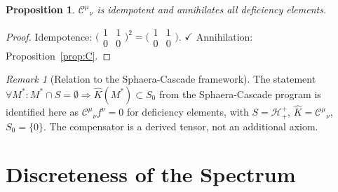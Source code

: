 \documentclass[12pt,a4paper]{article}
\newtheorem{proposition}[theorem]{Proposition}
\theoremstyle{remark}
\newtheorem*{remark}{Remark}
\begin{document}
\begin{proposition}\label{prop:calC}
$\mathcal{C}^{\mu}{}_\nu$ is idempotent and annihilates all deficiency elements.
\end{proposition}
\begin{proof}
Idempotence: $\bigl(\begin{smallmatrix}1&1\\0&0\end{smallmatrix}\bigr)^2
=\bigl(\begin{smallmatrix}1&1\\0&0\end{smallmatrix}\bigr)$. $\checkmark$
Annihilation: Proposition~\ref{prop:C}.
\end{proof}

\begin{remark}[Relation to the Sphaera-Cascade framework]
The statement
$\forall M^*: M^*\cap S=\emptyset\Rightarrow\hat{K}(M^*)\subset S_0$
from the Sphaera-Cascade program is identified here as
$\mathcal{C}^{\mu}{}_\nu f^\nu=0$ for deficiency elements,
with $S=\mathcal{H}^+_+$, $\hat{K}=\mathcal{C}^{\mu}{}_\nu$, $S_0=\{0\}$.
The compensator is a derived tensor, not an additional axiom.
\end{remark}


\section{Discreteness of the Spectrum}
\label{sec:discrete}
\end{document}
